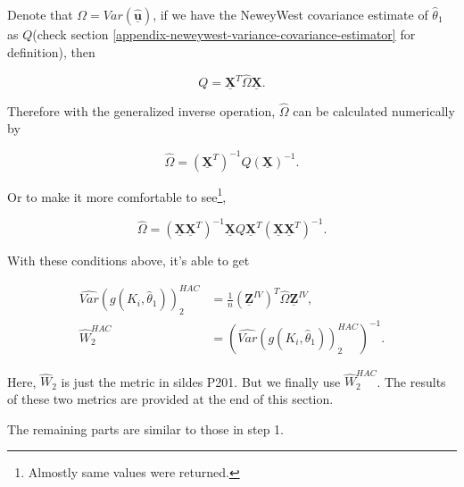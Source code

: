 \documentclass[
  12pt,
]{article}
\begin{document}
Denote that \(\Omega = Var(\hat{\mathbf{\underline{u}}})\), if we have the NeweyWest covariance estimate of \(\hat{\theta}_1\) as \(Q\)(check section \ref{appendix-neweywest-variance-covariance-estimator} for definition), then

\[  Q = \mathbf{\underline{X}}^T \widehat{\Omega} \mathbf{\underline{X}}. \]

Therefore with the generalized inverse operation, \(\widehat{\Omega}\) can be calculated numerically by

\[ \widehat{\Omega} = (\mathbf{\underline{X}}^T)^{-1} Q (\mathbf{\underline{X}})^{-1}. \]

Or to make it more comfortable to see\footnote{Almostly same values were returned.},

\[
    \widehat{\Omega} = \left(\mathbf{\underline{X}}\mathbf{\underline{X}}^T \right)^{-1} \mathbf{\underline{X}} Q \mathbf{\underline{X}}^T \left(\mathbf{\underline{X}}\mathbf{\underline{X}}^T \right)^{-1}.
\]

With these conditions above, it's able to get

\begin{align*}
    \widehat{Var}(g(K_i, \widehat{\theta}_1))_2^{HAC} & 
    = \frac{1}{n} (\mathbf{\underline{Z}}^{IV})^T \widehat{\Omega} \mathbf{\underline{Z}}^{IV},\\
    \widehat{W}_2^{HAC} & 
    = \left(\widehat{Var}(g(K_i, \widehat{\theta}_1))_2^{HAC} \right)^{-1}.
\end{align*}

Here, \(\widehat{W}_2\) is just the metric in sildes P201. But we finally use \(\widehat{W}_2^{HAC}\). The results of these two metrics are provided at the end of this section.

The remaining parts are similar to those in step 1.
\end{document}
